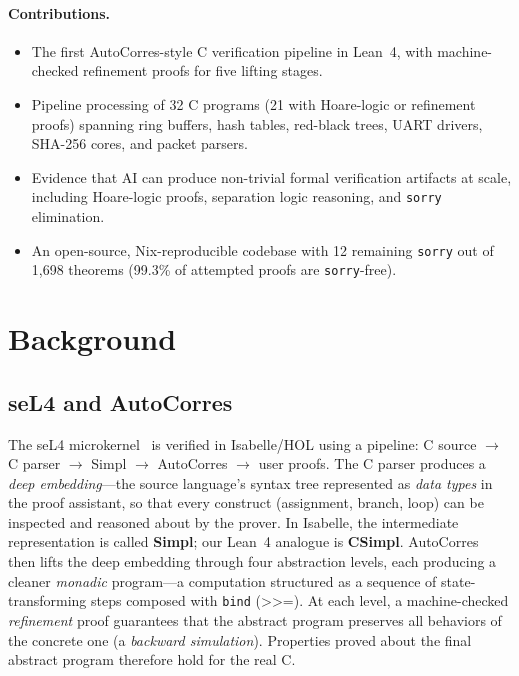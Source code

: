 \documentclass[sigconf,nonacm,screen]{acmart}
\begin{document}
\paragraph{Contributions.}
\begin{itemize}
\item The first AutoCorres-style C verification pipeline in Lean~4,
  with machine-checked refinement proofs for five lifting stages.
\item Pipeline processing of 32 C programs (21 with Hoare-logic or
  refinement proofs) spanning ring buffers, hash tables,
  red-black trees, UART drivers, SHA-256 cores, and packet parsers.
\item Evidence that AI can produce non-trivial formal verification
  artifacts at scale, including Hoare-logic proofs, separation logic
  reasoning, and \texttt{sorry} elimination.
\item An open-source, Nix-reproducible codebase with 12 remaining
  \texttt{sorry} out of 1,698 theorems (99.3\% of attempted proofs
  are \texttt{sorry}-free).
\end{itemize}

\section{Background}

\subsection{seL4 and AutoCorres}

The seL4 microkernel~\cite{klein2009sel4} is verified in Isabelle/HOL
using a pipeline: C source $\to$ C parser $\to$ Simpl $\to$
AutoCorres $\to$ user proofs. The C parser produces a \emph{deep
embedding}---the source language's syntax tree represented as
\emph{data types} in the proof assistant, so that every construct
(assignment, branch, loop) can be inspected and reasoned about
by the prover. In Isabelle, the intermediate representation is
called \textbf{Simpl}; our Lean~4 analogue is
\textbf{CSimpl}.
AutoCorres~\cite{greenaway2014autocorres,greenaway2012autocorres}
then lifts the deep embedding through four abstraction levels, each
producing a cleaner \emph{monadic} program---a computation
structured as a sequence of state-transforming steps composed with
\texttt{bind} ($\texttt{>>=}$). At each level, a machine-checked
\emph{refinement} proof guarantees that the abstract program
preserves all behaviors of the concrete one (a \emph{backward
simulation}). Properties proved about the final abstract program
therefore hold for the real C.
\end{document}
